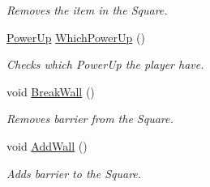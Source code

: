 \begin{DoxyCompactItemize}
\begin{DoxyCompactList}\small\item\em Removes the item in the Square. \end{DoxyCompactList}\item 
\hypertarget{class_c_square_a0bb1e16bf604445de2b8c52df64bf54f}{\hyperlink{common_8hpp_ab119e1d9a1ae19c7528143bf1fe16c3a}{Power\-Up} \hyperlink{class_c_square_a0bb1e16bf604445de2b8c52df64bf54f}{Which\-Power\-Up} ()}\label{class_c_square_a0bb1e16bf604445de2b8c52df64bf54f}

\begin{DoxyCompactList}\small\item\em Checks which Power\-Up the player have. \end{DoxyCompactList}\item 
\hypertarget{class_c_square_a2b72de0d1083323b80c8cd58374b3d22}{void \hyperlink{class_c_square_a2b72de0d1083323b80c8cd58374b3d22}{Break\-Wall} ()}\label{class_c_square_a2b72de0d1083323b80c8cd58374b3d22}

\begin{DoxyCompactList}\small\item\em Removes barrier from the Square. \end{DoxyCompactList}\item 
\hypertarget{class_c_square_a30a296e4d6dfa209b5036ebfee16968a}{void \hyperlink{class_c_square_a30a296e4d6dfa209b5036ebfee16968a}{Add\-Wall} ()}\label{class_c_square_a30a296e4d6dfa209b5036ebfee16968a}

\begin{DoxyCompactList}\small\item\em Adds barrier to the Square. \end{DoxyCompactList}\end{DoxyCompactItemize}
